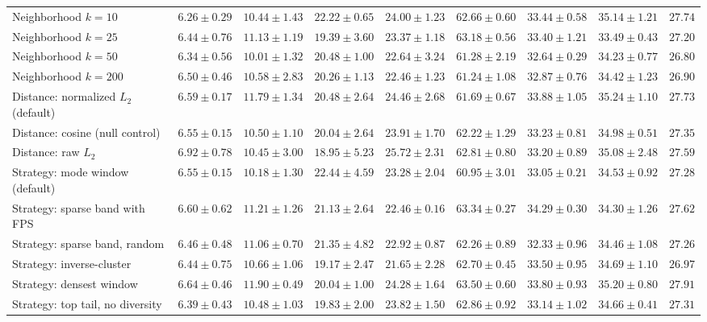 \begin{table}[t]
\begin{adjustbox}{max width=\textwidth}
\begin{tabular}{lcccccccc}
Neighborhood $k=10$ & $6.26\pm0.29$ & $10.44\pm1.43$ & $22.22\pm0.65$ & $24.00\pm1.23$ & $62.66\pm0.60$ & $33.44\pm0.58$ & $35.14\pm1.21$ & $27.74$ \\
Neighborhood $k=25$ & $6.44\pm0.76$ & $11.13\pm1.19$ & $19.39\pm3.60$ & $23.37\pm1.18$ & $63.18\pm0.56$ & $33.40\pm1.21$ & $33.49\pm0.43$ & $27.20$ \\
Neighborhood $k=50$ & $6.34\pm0.56$ & $10.01\pm1.32$ & $20.48\pm1.00$ & $22.64\pm3.24$ & $61.28\pm2.19$ & $32.64\pm0.29$ & $34.23\pm0.77$ & $26.80$ \\
Neighborhood $k=200$ & $6.50\pm0.46$ & $10.58\pm2.83$ & $20.26\pm1.13$ & $22.46\pm1.23$ & $61.24\pm1.08$ & $32.87\pm0.76$ & $34.42\pm1.23$ & $26.90$ \\
Distance: normalized $L_2$ (default) & $6.59\pm0.17$ & $11.79\pm1.34$ & $20.48\pm2.64$ & $24.46\pm2.68$ & $61.69\pm0.67$ & $33.88\pm1.05$ & $35.24\pm1.10$ & $27.73$ \\
Distance: cosine (null control) & $6.55\pm0.15$ & $10.50\pm1.10$ & $20.04\pm2.64$ & $23.91\pm1.70$ & $62.22\pm1.29$ & $33.23\pm0.81$ & $34.98\pm0.51$ & $27.35$ \\
Distance: raw $L_2$ & $6.92\pm0.78$ & $10.45\pm3.00$ & $18.95\pm5.23$ & $25.72\pm2.31$ & $62.81\pm0.80$ & $33.20\pm0.89$ & $35.08\pm2.48$ & $27.59$ \\
Strategy: mode window (default) & $6.55\pm0.15$ & $10.18\pm1.30$ & $22.44\pm4.59$ & $23.28\pm2.04$ & $60.95\pm3.01$ & $33.05\pm0.21$ & $34.53\pm0.92$ & $27.28$ \\
Strategy: sparse band with FPS & $6.60\pm0.62$ & $11.21\pm1.26$ & $21.13\pm2.64$ & $22.46\pm0.16$ & $63.34\pm0.27$ & $34.29\pm0.30$ & $34.30\pm1.26$ & $27.62$ \\
Strategy: sparse band, random & $6.46\pm0.48$ & $11.06\pm0.70$ & $21.35\pm4.82$ & $22.92\pm0.87$ & $62.26\pm0.89$ & $32.33\pm0.96$ & $34.46\pm1.08$ & $27.26$ \\
Strategy: inverse-cluster & $6.44\pm0.75$ & $10.66\pm1.06$ & $19.17\pm2.47$ & $21.65\pm2.28$ & $62.70\pm0.45$ & $33.50\pm0.95$ & $34.69\pm1.10$ & $26.97$ \\
Strategy: densest window & $6.64\pm0.46$ & $11.90\pm0.49$ & $20.04\pm1.00$ & $24.28\pm1.64$ & $63.50\pm0.60$ & $33.80\pm0.93$ & $35.20\pm0.80$ & $27.91$ \\
Strategy: top tail, no diversity & $6.39\pm0.43$ & $10.48\pm1.03$ & $19.83\pm2.00$ & $23.82\pm1.50$ & $62.86\pm0.92$ & $33.14\pm1.02$ & $34.66\pm0.41$ & $27.31$ \\
\bottomrule
\end{tabular}
\end{adjustbox}
\end{table}
